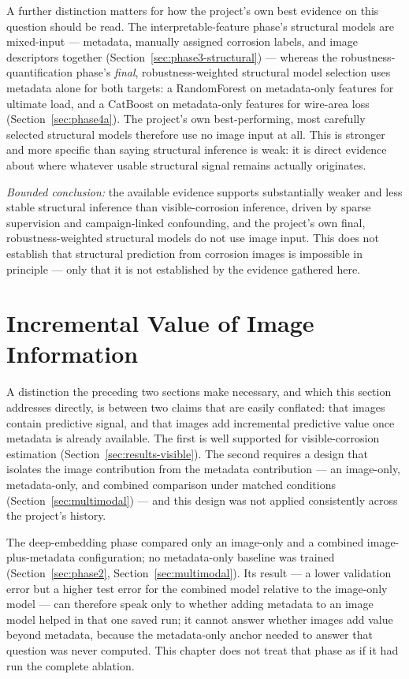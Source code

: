 A further distinction matters for how the project's own best evidence on
this question should be read. The interpretable-feature phase's structural
models are mixed-input — metadata, manually assigned corrosion labels, and
image descriptors together (Section~\ref{sec:phase3-structural}) — whereas
the robustness-quantification phase's \emph{final}, robustness-weighted
structural model selection uses metadata alone for both targets: a
RandomForest on metadata-only features for ultimate load, and a CatBoost on
metadata-only features for wire-area loss (Section~\ref{sec:phase4a}). The
project's own best-performing, most carefully selected structural models
therefore use no image input at all. This is stronger and more specific
than saying structural inference is weak: it is direct evidence about where
whatever usable structural signal remains actually originates.

\emph{Bounded conclusion:} the available evidence supports substantially
weaker and less stable structural inference than visible-corrosion
inference, driven by sparse supervision and campaign-linked confounding,
and the project's own final, robustness-weighted structural models do not
use image input. This does not establish that structural prediction from
corrosion images is impossible in principle — only that it is not
established by the evidence gathered here.

\section{Incremental Value of Image Information}
\label{sec:results-incremental}

A distinction the preceding two sections make necessary, and which this
section addresses directly, is between two claims that are easily
conflated: that images contain predictive signal, and that images add
incremental predictive value once metadata is already available. The first
is well supported for visible-corrosion estimation (Section~\ref{sec:results-visible}).
The second requires a design that isolates the image contribution from the
metadata contribution — an image-only, metadata-only, and combined
comparison under matched conditions (Section~\ref{sec:multimodal}) — and
this design was not applied consistently across the project's history.

The deep-embedding phase compared only an image-only and a combined
image-plus-metadata configuration; no metadata-only baseline was trained
(Section~\ref{sec:phase2}, Section~\ref{sec:multimodal}). Its result — a
lower validation error but a higher test error for the combined model
relative to the image-only model — can therefore speak only to whether
adding metadata to an image model helped in that one saved run; it cannot
answer whether images add value beyond metadata, because the metadata-only
anchor needed to answer that question was never computed. This chapter does
not treat that phase as if it had run the complete ablation.

